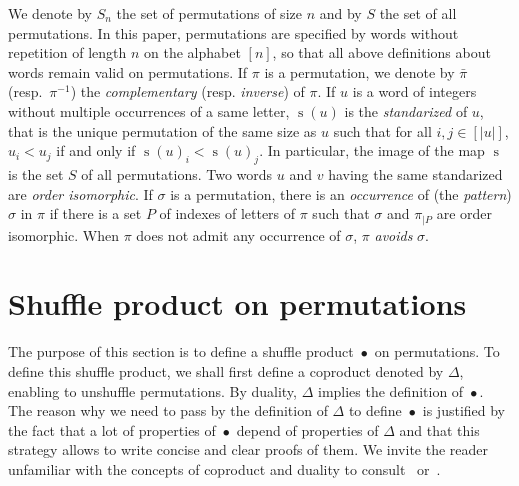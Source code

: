 \documentclass[a4paper,10pt]{llncs}
\DeclareMathOperator{\STD}{\mathrm{s}}
\DeclareMathOperator{\SHUFFLE}{\bullet}
\begin{document}
We denote by $S_n$ the set of permutations of size $n$ and by $S$ the
set of all permutations. In this paper, permutations are specified by
words without repetition of length $n$ on the alphabet $[n]$, so that
all above definitions about words remain valid on permutations. If
$\pi$ is a permutation, we denote by $\bar \pi$ (resp.~$\pi^{-1}$) the
{\em complementary} (resp. {\em inverse}) of $\pi$. If $u$ is a word of
integers without multiple occurrences of a same letter, $\STD(u)$ is the
{\em standarized} of $u$, that is the unique permutation of the same
size as $u$ such that for all $i, j \in [|u|]$, $u_i < u_j$ if and only
if $\STD(u)_i < \STD(u)_j$. In particular, the image of the map $\STD$
is the set $S$ of all permutations. Two words $u$ and $v$ having the
same standarized are {\em order isomorphic}. If $\sigma$ is a permutation,
there is an {\em occurrence} of (the {\em pattern}) $\sigma$ in $\pi$ if
there is a set $P$ of indexes of letters of $\pi$ such that $\sigma$ and
$\pi_{|P}$ are order isomorphic. When $\pi$ does not admit any occurrence
of $\sigma$, $\pi$ {\em avoids} $\sigma$.
\medskip


\section{Shuffle product on permutations}
\label{section:Shuffle product on permutations}

The purpose of this section is to define a shuffle product $\SHUFFLE$
on permutations. To define this shuffle product, we shall first define
a coproduct denoted by $\Delta$, enabling to unshuffle permutations.
By duality, $\Delta$ implies the definition of $\SHUFFLE$. The reason
why we need to pass by the definition of $\Delta$ to define $\SHUFFLE$
is justified by the fact that a lot of properties of $\SHUFFLE$ depend
of properties of $\Delta$ and that this strategy allows to write concise
and clear proofs of them. We invite the reader unfamiliar with the
concepts of coproduct and duality to consult~\cite{Joni:Rota:1979}
or~\cite{Grinberg:Reiner:2014}.
\medskip
\end{document}
